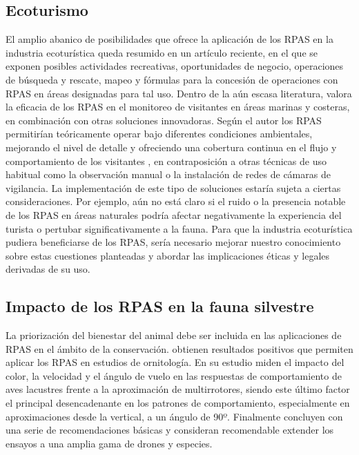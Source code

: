 \documentclass[9t,twocolumn]{article}
\begin{document}
\subsection{Ecoturismo}\label{ecoturismo}

El amplio abanico de posibilidades que ofrece la aplicación de los RPAS
en la industria ecoturística queda resumido en un artículo reciente, en
el que se exponen posibles actividades recreativas, oportunidades de
negocio, operaciones de búsqueda y rescate, mapeo y fórmulas para la
concesión de operaciones con RPAS en áreas designadas para tal uso.
Dentro de la aún escasa literatura, \citep{Hansen2016} valora la
eficacia de los RPAS en el monitoreo de visitantes en áreas marinas y
costeras, en combinación con otras soluciones innovadoras. Según el
autor los RPAS permitirían teóricamente operar bajo diferentes
condiciones ambientales, mejorando el nivel de detalle y ofreciendo una
cobertura continua en el flujo y comportamiento de los visitantes , en
contraposición a otras técnicas de uso habitual como la observación
manual o la instalación de redes de cámaras de vigilancia. La
implementación de este tipo de soluciones estaría sujeta a ciertas
consideraciones. Por ejemplo, aún no está claro si el ruido o la
presencia notable de los RPAS en áreas naturales podría afectar
negativamente la experiencia del turista o pertubar significativamente a
la fauna. Para que la industria ecoturística pudiera beneficiarse de los
RPAS, sería necesario mejorar nuestro conocimiento sobre estas
cuestiones planteadas y abordar las implicaciones éticas y legales
derivadas de su uso.

\subsection{Impacto de los RPAS en la fauna
silvestre}\label{impacto-de-los-rpas-en-la-fauna-silvestre}

La priorización del bienestar del animal debe ser incluida en las
aplicaciones de RPAS en el ámbito de la conservación. \citep{Vas2015}
obtienen resultados positivos que permiten aplicar los RPAS en estudios
de ornitología. En su estudio miden el impacto del color, la velocidad y
el ángulo de vuelo en las respuestas de comportamiento de aves lacustres
frente a la aproximación de multirrotores, siendo este último factor el
principal desencadenante en los patrones de comportamiento,
especialmente en aproximaciones desde la vertical, a un ángulo de 90º.
Finalmente concluyen con una serie de recomendaciones básicas y
consideran recomendable extender los ensayos a una amplia gama de drones
y especies.
\end{document}
